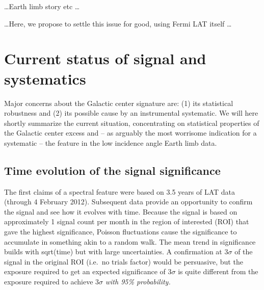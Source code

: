 \documentclass[aps,prd,superscriptaddress,showpacs,nofootinbib,fixlfloat, 12pt]{revtex4-1}
\begin{document}
 

\dots Earth limb story etc \dots

\dots Here, we propose to settle this issue for good, using Fermi LAT itself
\dots

\section{Current status of signal and systematics}
Major concerns about the Galactic center signature are: (1) its statistical
robustness and (2) its possible cause by an instrumental systematic. We will
here shortly summarize the current situation, concentrating on statistical
properties of the Galactic center excess and -- as arguably the most worrisome
indication for a systematic -- the feature in the low incidence angle Earth
limb data.

\subsection{Time evolution of the signal significance}
The first claims of a spectral feature \citep{Bringmann:2012,Weniger:2012}
were based on 3.5 years of LAT data (through 4 February 2012).  Subsequent
data provide an opportunity to confirm the signal and see how it evolves with
time.  Because the signal is based on approximately 1 signal count per month
in the region of interested (ROI) that gave the highest significance, Poisson fluctuations cause the significance to accumulate in
something akin to a random walk.  The mean trend in significance builds with
sqrt(time) but with large uncertainties.  A confirmation at $3\sigma$ of the
signal in the original ROI (i.e.~no trials factor) would be persuasive, but
the exposure required to get an expected significance of $3\sigma$ is quite
different from the exposure required to achieve $3\sigma$ \emph{with 95\%
  probability.}
\end{document}
